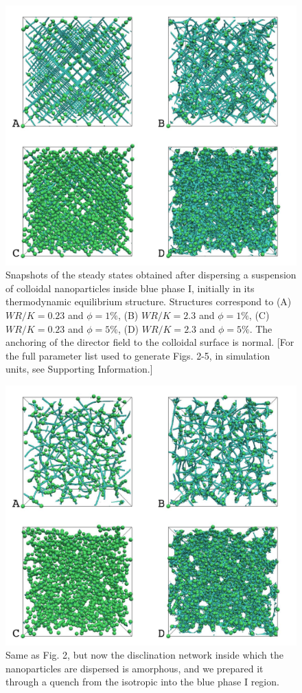 \documentclass[12pt]{article}
\begin{document}
\begin{figure}
\includegraphics[width=\textwidth]{s1.jpg}
\caption{Snapshots of the steady states obtained after dispersing
a suspension of colloidal nanoparticles inside blue phase I, initially
in its thermodynamic equilibrium structure. Structures correspond
to (A) $WR/K=0.23$ and $\phi=1\%$, (B) $WR/K=2.3$ and $\phi=1\%$,
(C) $WR/K=0.23$ and $\phi=5\%$, (D) $WR/K=2.3$ and $\phi=5\%$.
The anchoring of the director field to the colloidal surface is normal.
[For the full parameter list used to generate Figs. 2-5, 
in simulation units, see Supporting Information.] }
\end{figure}

\begin{figure}
\includegraphics[width=\textwidth]{s2.jpg}
\caption{Same as Fig. 2, but now the disclination network
inside which the nanoparticles are dispersed is 
amorphous, and we prepared it through
a quench from the isotropic into the blue phase  I region.}
\end{figure}
\end{document}
